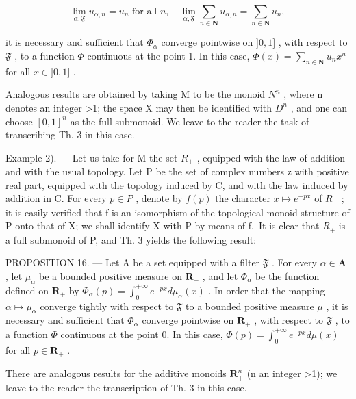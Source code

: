 \[
\lim _ {\alpha , \mathfrak {F}} u _ {\alpha , n} = u _ {n} \text {   for   all   } n, \quad \lim _ {\alpha , \mathfrak {F}} \sum_ {n \in \mathbf {N}} u _ {\alpha , n} = \sum_ {n \in \mathbf {N}} u _ {n},
\]

it is necessary and sufficient that \(\Phi_{\alpha}\) converge pointwise on \(]0,1]\) , with respect to \(\mathfrak{F}\) , to a function \(\Phi\) continuous at the point 1. In this case, \(\Phi(x) = \sum_{n \in \mathbf{N}} u_n x^n\) for all \(x \in ]0,1]\) .

Analogous results are obtained by taking M to be the monoid \(N^{n}\) , where n denotes an integer \textgreater1; the space X may then be identified with \(D^{n}\) , and one can choose \([0,1]^{n}\) as the full submonoid. We leave to the reader the task of transcribing Th. 3 in this case.

Example 2). --- Let us take for M the set \(R_{+}\) , equipped with the law of addition and with the usual topology. Let P be the set of complex numbers z with positive real part, equipped with the topology induced by C, and with the law induced by addition in C. For every \(p \in P\) , denote by \(f(p)\) the character \(x \mapsto e^{-px}\) of \(R_{+}\) ; it is easily verified that f is an isomorphism of the topological monoid structure of P onto that of X; we shall identify X with P by means of f.~It is clear that \(R_{+}\) is a full submonoid of P, and Th. 3 yields the following result:

PROPOSITION 16. --- Let A be a set equipped with a filter \(\mathfrak{F}\) . For every \(\alpha \in \mathbf{A}\) , let \(\mu_{\alpha}\) be a bounded positive measure on \(\mathbf{R}_{+}\) , and let \(\Phi_{\alpha}\) be the function defined on \(\mathbf{R}_{+}\) by \(\Phi_{\alpha}(p) = \int_{0}^{+\infty} e^{-px} d\mu_{\alpha}(x)\) . In order that the mapping \(\alpha \mapsto \mu_{\alpha}\) converge tightly with respect to \(\mathfrak{F}\) to a bounded positive measure \(\mu\) , it is necessary and sufficient that \(\Phi_{\alpha}\) converge pointwise on \(\mathbf{R}_{+}\) , with respect to \(\mathfrak{F}\) , to a function \(\Phi\) continuous at the point 0. In this case, \(\Phi(p) = \int_{0}^{+\infty} e^{-px} d\mu(x)\) for all \(p \in \mathbf{R}_{+}\) .

There are analogous results for the additive monoids \(\mathbf{R}_{+}^{n}\) (n an integer \textgreater1); we leave to the reader the transcription of Th. 3 in this case.

